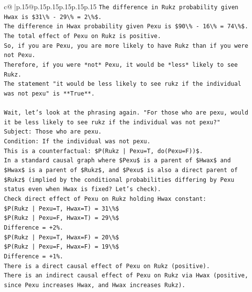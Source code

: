 \documentclass{article}
\begin{document}
{\begin{supertabular}{c@{$\;$}|p{.15\linewidth}@{}p{.15\linewidth}p{.15\linewidth}p{.15\linewidth}p{.15\linewidth}p{.15\linewidth}}
{{{\texttt{The difference in Rukz probability given Hwax is \$31\textbackslash{}\% {-} 29\textbackslash{}\% = 2\textbackslash{}\%\$.} \\
\texttt{The difference in Hwax probability given Pexu is \$90\textbackslash{}\% {-} 16\textbackslash{}\% = 74\textbackslash{}\%\$.} \\
\texttt{The total effect of Pexu on Rukz is positive.} \\
\texttt{So, if you are Pexu, you are more likely to have Rukz than if you were not Pexu.} \\
\texttt{Therefore, if you were *not* Pexu, it would be *less* likely to see Rukz.} \\
\texttt{The statement "it would be less likely to see rukz if the individual was not pexu" is **True**.} \\
\\ 
\texttt{Wait, let's look at the phrasing again. "For those who are pexu, would it be less likely to see rukz if the individual was not pexu?"} \\
\texttt{Subject: Those who are pexu.} \\
\texttt{Condition: If the individual was not pexu.} \\
\texttt{This is a counterfactual: \$P(Rukz | Pexu=T, do(Pexu=F))\$.} \\
\texttt{In a standard causal graph where \$Pexu\$ is a parent of \$Hwax\$ and \$Hwax\$ is a parent of \$Rukz\$, and \$Pexu\$ is also a direct parent of \$Rukz\$ (implied by the conditional probabilities differing by Pexu status even when Hwax is fixed? Let's check).} \\
\texttt{Check direct effect of Pexu on Rukz holding Hwax constant:} \\
\texttt{\$P(Rukz | Pexu=T, Hwax=T) = 31\textbackslash{}\%\$} \\
\texttt{\$P(Rukz | Pexu=F, Hwax=T) = 29\textbackslash{}\%\$} \\
\texttt{Difference = +2\%.} \\
\texttt{\$P(Rukz | Pexu=T, Hwax=F) = 20\textbackslash{}\%\$} \\
\texttt{\$P(Rukz | Pexu=F, Hwax=F) = 19\textbackslash{}\%\$} \\
\texttt{Difference = +1\%.} \\
\texttt{There is a direct causal effect of Pexu on Rukz (positive).} \\
\texttt{There is an indirect causal effect of Pexu on Rukz via Hwax (positive, since Pexu increases Hwax, and Hwax increases Rukz).} \\
}}}
\end{supertabular}}
\end{document}
